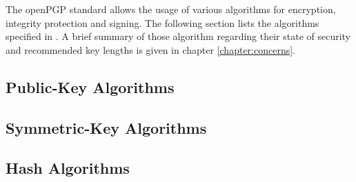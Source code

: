 

The openPGP standard allows the usage of various algorithms for encryption, integrity protection and signing. The following section lists the algorithms specified in \citep[section 9]{RFC4880}. A brief summary of those algorithm regarding their state of security and recommended key lengths is given in chapter \ref{chapter:concerns}.

\subsection{Public-Key Algorithms}

\subsection{Symmetric-Key Algorithms}

\subsection{Hash Algorithms}

